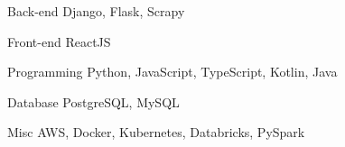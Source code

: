 

\begin{cvskills}

  \cvskill
    {Back-end} %
    {Django, Flask, Scrapy} %

  \cvskill
    {Front-end} %
    {ReactJS} %

  \cvskill
    {Programming}
    {Python, JavaScript, TypeScript, Kotlin, Java}

  \cvskill
    {Database}
    {PostgreSQL, MySQL}

  \cvskill
    {Misc}
    {AWS, Docker, Kubernetes, Databricks, PySpark}

\end{cvskills}
